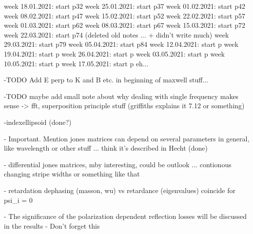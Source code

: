 week 18.01.2021: start p32
week 25.01.2021: start p37
week 01.02.2021: start p42
week 08.02.2021: start p47
week 15.02.2021: start p52
week 22.02.2021: start p57
week 01.03.2021: start p62
week 08.03.2021: start p67
week 15.03.2021: start p72
week 22.03.2021: start p74 (deleted old notes ... + didn't write much)
week 29.03.2021: start p79
week 05.04.2021: start p84
week 12.04.2021: start p
week 19.04.2021: start p
week 26.04.2021: start p
week 03.05.2021: start p
week 10.05.2021: start p
week 17.05.2021: start p eh...


-TODO Add E perp to K and B etc. in beginning of maxwell stuff...

-TODO maybe add small note about why dealing with single frequency makes sense -> fft, superposition principle stuff (griffiths explains it 7.12 or something)

-indexellipsoid (done?)

- Important. Mention jones matrices can depend on several parameters in general, like wavelength or other stuff ... think it's described in Hecht (done)

- differential jones matrices, mby interesting, could be outlook ... contionous changing stripe widths or something like that

- retardation dephasing (masson, wu) vs retardance (eigenvalues) coincide for psi_i = 0

- The significance of the polarization dependent reflection losses will be discussed in the results
    - Don't forget this
    
